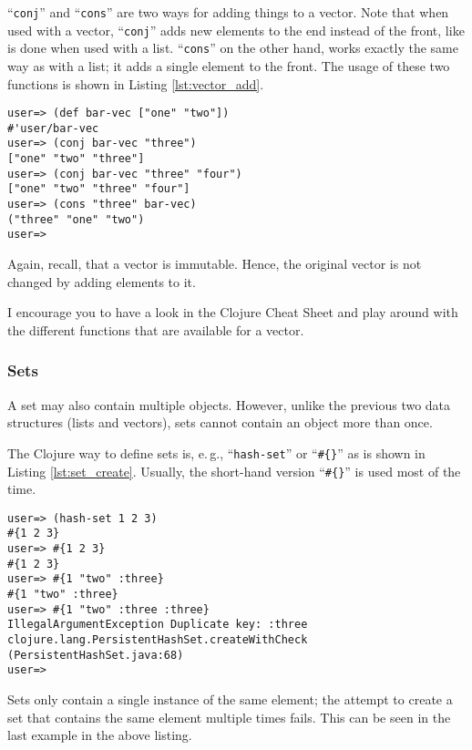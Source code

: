 ``\texttt{conj}'' and ``\texttt{cons}'' are two ways for adding things to a vector.
Note that when used with a vector, ``\texttt{conj}'' adds new elements to the end instead of the front, like is done when used with a list.
``\texttt{cons}'' on the other hand, works exactly the same way as with a list; it adds a single element to the front.
The usage of these two functions is shown in Listing \vref{lst:vector_add}.

\begin{lstlisting}[label=lst:vector_add, caption=Two Examplary Functions for Adding Things to a Vector]
user=> (def bar-vec ["one" "two"])
#'user/bar-vec
user=> (conj bar-vec "three")
["one" "two" "three"]
user=> (conj bar-vec "three" "four")
["one" "two" "three" "four"]
user=> (cons "three" bar-vec)
("three" "one" "two")
user=> 
\end{lstlisting}

Again, recall, that a vector is immutable.
Hence, the original vector is not changed by adding elements to it.

I encourage you to have a look in the Clojure Cheat Sheet and play around with the different functions that are available for a vector.

\subsubsection{Sets}
\label{sec:sets}
A set may also contain multiple objects.
However, unlike the previous two data structures (lists and vectors), sets cannot contain an object more than once.

The Clojure way to define sets is, e.\,g., ``\texttt{hash-set}'' or ``\texttt{\#\{\}}'' as is shown in Listing \vref{lst:set_create}.
Usually, the short-hand version ``\texttt{\#\{\}}'' is used most of the time.

\begin{lstlisting}[label=lst:set_create, caption=Create sets.]
user=> (hash-set 1 2 3)
#{1 2 3}
user=> #{1 2 3}
#{1 2 3}
user=> #{1 "two" :three}
#{1 "two" :three}
user=> #{1 "two" :three :three}
IllegalArgumentException Duplicate key: :three  clojure.lang.PersistentHashSet.createWithCheck (PersistentHashSet.java:68)
user=> 
\end{lstlisting}

Sets only contain a single instance of the same element; the attempt to create a set that contains the same element multiple times fails.
This can be seen in the last example in the above listing.

